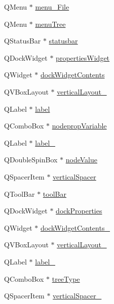 \begin{DoxyCompactItemize}
Q\+Menu $\ast$ \mbox{\hyperlink{class_ui___dt_editor_window_adb06cf8b18fbbe1aeed45309df37b8d5}{menu\+\_\+\+File}}
\item 
Q\+Menu $\ast$ \mbox{\hyperlink{class_ui___dt_editor_window_afe2c6239100b6978ced122e20e01ed40}{menu\+Tree}}
\item 
Q\+Status\+Bar $\ast$ \mbox{\hyperlink{class_ui___dt_editor_window_aa3c3a044ea0a3dc339457d7c80e3487a}{statusbar}}
\item 
Q\+Dock\+Widget $\ast$ \mbox{\hyperlink{class_ui___dt_editor_window_a2f5bda6479b94c66e79994d1e45068df}{properties\+Widget}}
\item 
Q\+Widget $\ast$ \mbox{\hyperlink{class_ui___dt_editor_window_ad4b9ef870b371cfe61b94e0443df2518}{dock\+Widget\+Contents}}
\item 
Q\+V\+Box\+Layout $\ast$ \mbox{\hyperlink{class_ui___dt_editor_window_a5fb52255dd3f5acfd2e394306433ae15}{vertical\+Layout\+\_}}
\item 
Q\+Label $\ast$ \mbox{\hyperlink{class_ui___dt_editor_window_a3d0143731cab4a70d47d627a7f7b88fe}{label}}
\item 
Q\+Combo\+Box $\ast$ \mbox{\hyperlink{class_ui___dt_editor_window_a13e5692170099a11fced561b87a79e4f}{nodeprop\+Variable}}
\item 
Q\+Label $\ast$ \mbox{\hyperlink{class_ui___dt_editor_window_a038f9446c881e4d97fb1b462f8d24458}{label\+\_}}
\item 
Q\+Double\+Spin\+Box $\ast$ \mbox{\hyperlink{class_ui___dt_editor_window_a99d1b45479918e9837b608064d8ff208}{node\+Value}}
\item 
Q\+Spacer\+Item $\ast$ \mbox{\hyperlink{class_ui___dt_editor_window_a488b70e5e6388eeb23fa5e32180f0429}{vertical\+Spacer}}
\item 
Q\+Tool\+Bar $\ast$ \mbox{\hyperlink{class_ui___dt_editor_window_a23868d06c64f77f6fac552b2deaa614f}{tool\+Bar}}
\item 
Q\+Dock\+Widget $\ast$ \mbox{\hyperlink{class_ui___dt_editor_window_a0d37b519ca0e27a141611df417068d73}{dock\+Properties}}
\item 
Q\+Widget $\ast$ \mbox{\hyperlink{class_ui___dt_editor_window_afd5df54165e6c75dfed246d4270a5d47}{dock\+Widget\+Contents\+\_}}
\item 
Q\+V\+Box\+Layout $\ast$ \mbox{\hyperlink{class_ui___dt_editor_window_ac3ab88c7cf029f022b53b68eb98f757a}{vertical\+Layout\+\_}}
\item 
Q\+Label $\ast$ \mbox{\hyperlink{class_ui___dt_editor_window_a257436695ad7842c7a564a9a7f8e791e}{label\+\_}}
\item 
Q\+Combo\+Box $\ast$ \mbox{\hyperlink{class_ui___dt_editor_window_a77472ff5a38239c5a0be0161840138bf}{tree\+Type}}
\item 
Q\+Spacer\+Item $\ast$ \mbox{\hyperlink{class_ui___dt_editor_window_ade65903d5f65f0ca5e522b2d15c6cdcc}{vertical\+Spacer\+\_}}
\end{DoxyCompactItemize}


